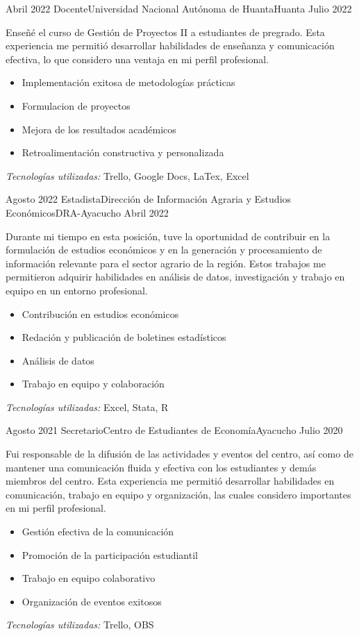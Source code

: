 
\begin{experiences}

  \experience
  {Abril 2022}    {Docente}{Universidad Nacional Autónoma de Huanta}{Huanta}
  {Julio 2022}   {
    Enseñé el curso de Gestión de Proyectos II a estudiantes de pregrado. Esta experiencia me permitió desarrollar habilidades de enseñanza y comunicación efectiva, lo que considero una ventaja en mi perfil profesional.
    \begin{itemize}
      \item Implementación exitosa de metodologías prácticas
      \item Formulacion de proyectos
      \item Mejora de los resultados académicos
      \item Retroalimentación constructiva y personalizada
    \end{itemize}
  }
  {\footnotesize{\emph{Tecnologías utilizadas:} Trello, Google Docs, LaTex, Excel}}
  \emptySeparator

  \experience
  {Agosto 2022}    {Estadista}{Dirección de Información Agraria y Estudios Económicos}{DRA-Ayacucho}
  {Abril 2022}   {
    Durante mi tiempo en esta posición, tuve la oportunidad de contribuir en la formulación de estudios económicos y en la generación y procesamiento de información relevante para el sector agrario de la región. Estos trabajos me permitieron adquirir habilidades en análisis de datos, investigación y trabajo en equipo en un entorno profesional.
    \begin{itemize}
      \item Contribución en estudios económicos
      \item Redación y publicación de boletines estadísticos
      \item Análisis de datos
      \item Trabajo en equipo y colaboración
    \end{itemize}
  }
  {\footnotesize{\emph{Tecnologías utilizadas:} Excel, Stata, R}}
  \emptySeparator

  \experience
  {Agosto 2021}    {Secretario}{Centro de Estudiantes de Economía}{Ayacucho}
  {Julio 2020}   {
    Fui responsable de la difusión de las actividades y eventos del centro, así como de mantener una comunicación fluida y efectiva con los estudiantes y demás miembros del centro. Esta experiencia me permitió desarrollar habilidades en comunicación, trabajo en equipo y organización, las cuales considero importantes en mi perfil profesional.
    \begin{itemize}
      \item Gestión efectiva de la comunicación
      \item Promoción de la participación estudiantil
      \item Trabajo en equipo colaborativo
      \item Organización de eventos exitosos
    \end{itemize}
  }
  {\footnotesize{\emph{Tecnologías utilizadas:} Trello, OBS}}
  \emptySeparator


\end{experiences}
